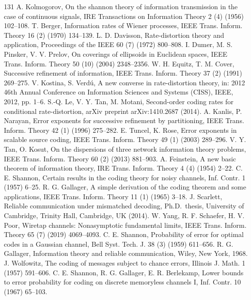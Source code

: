 \begin{thebibliography}{131}
 A. Kolmogorov, On the shannon theory of information transmission in the case of continuous signals, IRE Transactions on Information Theory 2 (4) (1956) 102--108.
 T. Berger, Information rates of Wiener processes, IEEE Trans. Inform. Theory 16 (2) (1970) 134--139.
 L. D. Davisson, Rate-distortion theory and application, Proceedings of the IEEE 60 (7) (1972) 800--808.
 I. Dumer, M. S. Pinsker, V. V. Prelov, On coverings of ellipsoids in Euclidean spaces, IEEE Trans. Inform. Theory 50 (10) (2004) 2348--2356.
 W. H. Equitz, T. M. Cover, Successive refinement of information, IEEE Trans. Inform. Theory 37 (2) (1991) 269--275.
 V. Kostina, S. Verdú, A new converse in rate-distortion theory, in: 2012 46th Annual Conference on Information Sciences and Systems (CISS), IEEE, 2012, pp. 1--6.
 S.-Q. Le, V. Y. Tan, M. Motani, Second-order coding rates for conditional rate-distortion, arXiv preprint arXiv:1410.2687 (2014).
 A. Kanlis, P. Narayan, Error exponents for successive refinement by partitioning, IEEE Trans. Inform. Theory 42 (1) (1996) 275--282.
 E. Tuncel, K. Rose, Error exponents in scalable source coding, IEEE Trans. Inform. Theory 49 (1) (2003) 289--296.
 V. Y. Tan, O. Kosut, On the dispersions of three network information theory problems, IEEE Trans. Inform. Theory 60 (2) (2013) 881--903.
 A. Feinstein, A new basic theorem of information theory, IRE Trans. Inform. Theory 4 (4) (1954) 2--22.
 C. E. Shannon, Certain results in the coding theory for noisy channels, Inf. Contr. 1 (1957) 6--25.
 R. G. Gallager, A simple derivation of the coding theorem and some applications, IEEE Trans. Inform. Theory 11 (1) (1965) 3--18.
 J. Scarlett, Reliable communication under mismatched decoding, Ph.D.\ thesis, University of Cambridge, Trinity Hall, Cambridge, UK (2014).
 W. Yang, R. F. Schaefer, H. V. Poor, Wiretap channels: Nonasymptotic fundamental limits, IEEE Trans. Inform. Theory 65 (7) (2019) 4069--4093.
 C. E. Shannon, Probability of error for optimal codes in a Gaussian channel, Bell Syst. Tech. J. 38 (3) (1959) 611--656.
 R. G. Gallager, Information theory and reliable communication, Wiley, New York, 1968.
 J. Wolfowitz, The coding of messages subject to chance errors, Illinois J. Math. 1 (1957) 591--606.
 C. E. Shannon, R. G. Gallager, E. R. Berlekamp, Lower bounds to error probability for coding on discrete memoryless channels I, Inf. Contr. 10 (1967) 65--103.

\end{thebibliography}
